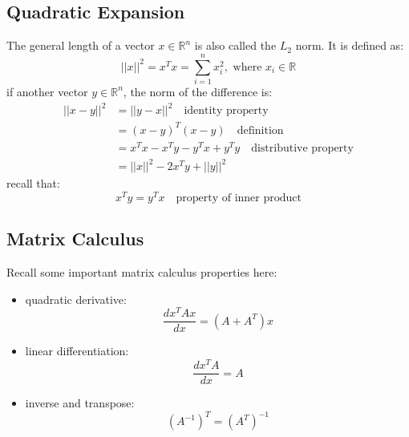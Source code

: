 \documentclass[10pt,a4paper,oneside]{article}
\begin{document}
\subsection{Quadratic Expansion}
The general length of a vector $x \in \mathbb{R}^n$ is also called the $L_2$ norm. It is defined as:
\[
||x||^2 = x^T x = \sum_{i=1}^{n} x_i ^2, \text{ where } x_i \in \mathbb{R} 
\]
if another vector $y \in \mathbb{R}^n$, the norm of the difference is:
\begin{align*}
||x-y||^2 &= ||y-x||^2 \quad \text{identity property}\\
& = (x-y)^T (x-y) \quad \text{definition}\\
& = x^Tx - x^Ty - y^Tx + y^Ty \quad \text{distributive property}\\
& = ||x||^2 -2x^Ty +||y||^2
\end{align*}
recall that:
\[
x^Ty = y^Tx \quad \text{property of inner product}
\]

\subsection{Matrix Calculus}
Recall some important matrix calculus properties here:
\begin{itemize}
	\item quadratic derivative:
	\[
	\frac{d x^T A x}{dx} = (A + A^T) x
	\]
	\item linear differentiation:
	\[
	\frac{d x^T A}{dx} = A
	\]
	\item inverse and transpose:
	\[
	(A^{-1})^T = (A^T)^{-1}
	\]
\end{itemize}
\end{document}
